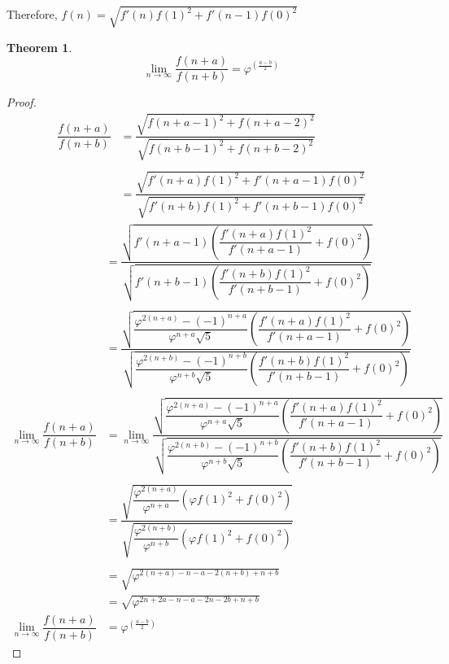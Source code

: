 \documentclass[preprint,12pt]{elsarticle}
\newtheorem{theorem}{Theorem}[section]
\begin{document}
	Therefore, $f(n) = \sqrt{f'(n)f(1)^2 + f'(n - 1)f(0)^2}$
	
	\begin{theorem}
		\label{lim-cons}
		$$\lim_{n \to \infty} \dfrac{f(n + a)}{f(n + b)} = \varphi^{\left (\displaystyle \frac{a - b}{2} \right)}$$
	\end{theorem}
	\begin{proof}
		\begin{align*}
		\dfrac{f(n + a)}{f(n + b)} &= \dfrac{\sqrt{f(n + a -1)^2 + f(n + a - 2)^2}}{\sqrt{f(n + b - 1)^2 + f(n + b - 2)^2}}\\\\
		&= \dfrac{\sqrt{f'(n + a)f(1)^2 + f'(n + a - 1)f(0)^2}}{\sqrt{f'(n + b)f(1)^2 + f'(n + b - 1)f(0)^2}}
		\end{align*}
		\begin{align*}
		&= \dfrac{\sqrt{f'(n + a - 1)\left(\dfrac{f'(n + a)f(1)^2}{f'(n + a - 1)} + f(0)^2\right)}}{\sqrt{f'(n + b - 1)\left(\dfrac{f'(n + b)f(1)^2}{f'(n + b - 1)} + f(0)^2\right)}}\\\\
		&= \dfrac{\sqrt{\dfrac{\varphi^{2(n + a)} - (-1)^{n + a}}{\varphi^{n + a}\sqrt{5}}\left(\dfrac{f'(n + a)f(1)^2}{f'(n + a - 1)} + f(0)^2\right)}}{\sqrt{\dfrac{\varphi^{2(n + b)} - (-1)^{n + b}}{\varphi^{n + b}\sqrt{5}}\left(\dfrac{f'(n + b)f(1)^2}{f'(n + b - 1)} + f(0)^2\right)}}\\\\
		\lim_{n \to \infty} \dfrac{f(n + a)}{f(n + b)}
		&= \lim_{n \to \infty} \dfrac{\sqrt{\dfrac{\varphi^{2(n + a)} - (-1)^{n + a}}{\varphi^{n + a}\sqrt{5}}\left(\dfrac{f'(n + a)f(1)^2}{f'(n + a - 1)} + f(0)^2\right)}}{\sqrt{\dfrac{\varphi^{2(n + b)} - (-1)^{n + b}}{\varphi^{n + b}\sqrt{5}}\left(\dfrac{f'(n + b)f(1)^2}{f'(n + b - 1)} + f(0)^2\right)}}\\\\
		&= \dfrac{\sqrt{\dfrac{\varphi^{2(n + a)}}{\varphi^{n + a}}\left(\varphi f(1)^2 + f(0)^2\right)}}{\sqrt{\dfrac{\varphi^{2(n + b)}}{\varphi^{n + b}}\left(\varphi f(1)^2 + f(0)^2\right)}}\\\\
		&= \sqrt{\varphi^{2(n + a) - n - a - 2(n + b) + n + b}}\\
		&= \sqrt{\varphi^{2n + 2a - n - a -2n -2b + n + b}}\\
		\lim_{n \to \infty} \dfrac{f(n + a)}{f(n + b)}
		&= \varphi^{\left (\displaystyle \frac{a - b}{2} \right)}
		\end{align*}
	\end{proof}
\end{document}
